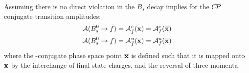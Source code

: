 \clearpage
Assuming there is no direct \CP violation in the $B_s$ decay implies for the ${C\!P}$ conjugate transition amplitudes:
\begin{align}
\mathcal A(\bar B_s^0 \rightarrow \bar f) &=  \mathcal A^c_{\bar f}(\mathbf{x}) = \mathcal A^c_f(\overline{\mathbf{x}})  \\       
\mathcal A(B_s^0 \rightarrow \bar f) &= \mathcal A^u_{\bar f}(\mathbf{x})  = \mathcal A^u_{f}(\overline{\mathbf{x}}) 
\end{align}
where the \CP-conjugate phase space point $\overline{\mathbf{x}}$ is defined such that it is mapped onto $\mathbf{x}$ by the interchange of final state charges, and the reversal of three-momenta.

